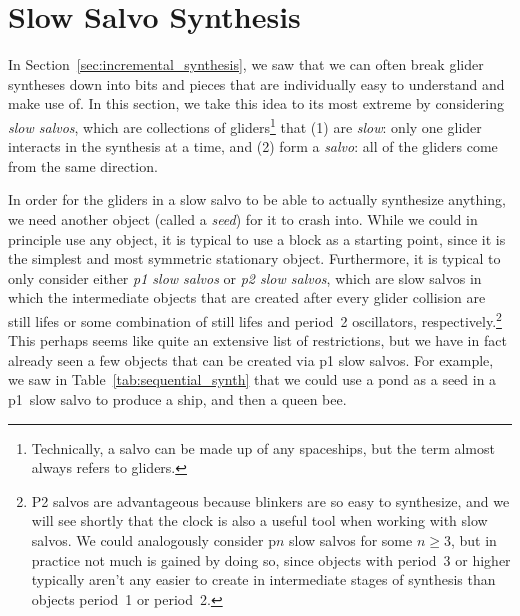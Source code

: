 \section{Slow Salvo Synthesis}\label{sec:slow_salvo}

In Section~\ref{sec:incremental_synthesis}, we saw that we can often break glider syntheses down into bits and pieces that are individually easy to understand and make use of. In this section, we take this idea to its most extreme by considering \emph{slow salvos}, which are collections of gliders\footnote{Technically, a salvo can be made up of any spaceships, but the term almost always refers to gliders.} that (1) are \emph{slow}: only one glider interacts in the synthesis at a time, and (2) form a \emph{salvo}: all of the gliders come from the same direction.

In order for the gliders in a slow salvo to be able to actually synthesize anything, we need another object (called a \emph{seed}) for it to crash into. While we could in principle use any object, it is typical to use a block as a starting point, since it is the simplest and most symmetric stationary object. Furthermore, it is typical to only consider either \emph{p1 slow salvos} or \emph{p2 slow salvos}, which are slow salvos in which the intermediate objects that are created after every glider collision are still lifes or some combination of still lifes and period~2 oscillators, respectively.\footnote{P2 salvos are advantageous because blinkers are so easy to synthesize, and we will see shortly that the clock is also a useful tool when working with slow salvos. We could analogously consider p$n$ slow salvos for some $n \geq 3$, but in practice not much is gained by doing so, since objects with period~3 or higher typically aren't any easier to create in intermediate stages of synthesis than objects period~1 or period~2.} This perhaps seems like quite an extensive list of restrictions, but we have in fact already seen a few objects that can be created via p1 slow salvos. For example, we saw in Table~\ref{tab:sequential_synth} that we could use a pond as a seed in a p1~slow salvo to produce a ship, and then a queen bee. %

